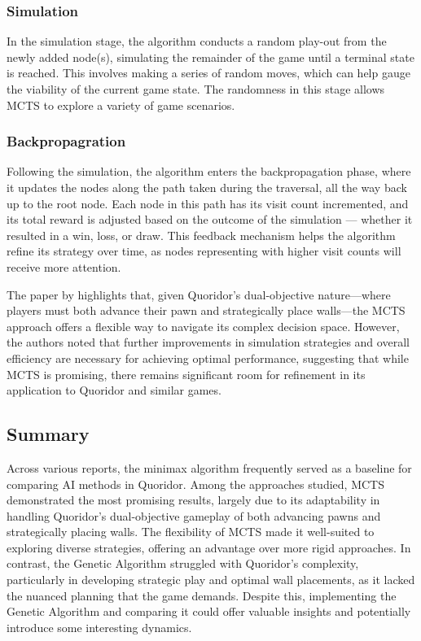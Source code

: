 \documentclass[review]{cmpreport}
\begin{document}
\subsubsection{Simulation}
In the simulation stage, the algorithm conducts a random play-out from the newly added node(s), simulating the remainder of the game until a terminal state is reached. This involves making a series of random moves, which can help gauge the viability of the current game state. The randomness in this stage allows MCTS to explore a variety of game scenarios.

\subsubsection{Backpropagration}
Following the simulation, the algorithm enters the backpropagation phase, where it updates the nodes along the path taken during the traversal, all the way back up to the root node. Each node in this path has its visit count incremented, and its total reward is adjusted based on the outcome of the simulation — whether it resulted in a win, loss, or draw. This feedback mechanism helps the algorithm refine its strategy over time, as nodes representing with higher visit counts will receive more attention.

\noindent The paper by \cite{respall2018monte} highlights that, given Quoridor's dual-objective nature—where players must both advance their pawn and strategically place walls—the MCTS approach offers a flexible way to navigate its complex decision space. However, the authors noted that further improvements in simulation strategies and overall efficiency are necessary for achieving optimal performance, suggesting that while MCTS is promising, there remains significant room for refinement in its application to Quoridor and similar games.

\subsection{Summary}
Across various reports, the minimax algorithm frequently served as a baseline for comparing AI methods in Quoridor. Among the approaches studied, MCTS demonstrated the most promising results, largely due to its adaptability in handling Quoridor’s dual-objective gameplay of both advancing pawns and strategically placing walls. The flexibility of MCTS made it well-suited to exploring diverse strategies, offering an advantage over more rigid approaches. In contrast, the Genetic Algorithm struggled with Quoridor’s complexity, particularly in developing strategic play and optimal wall placements, as it lacked the nuanced planning that the game demands. Despite this, implementing the Genetic Algorithm and comparing it could offer valuable insights and potentially introduce some interesting dynamics.
\end{document}
